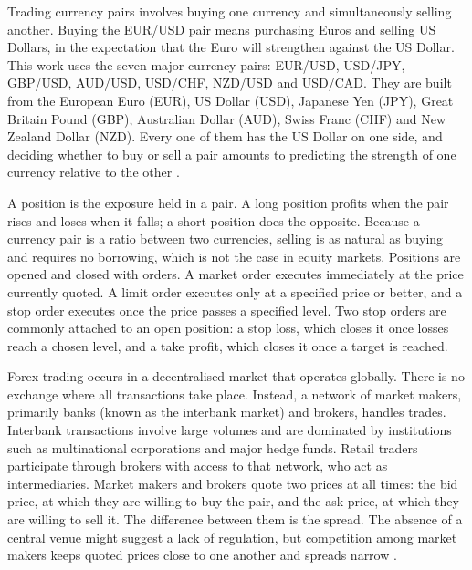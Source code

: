Trading currency pairs involves buying one currency and simultaneously selling another. Buying the EUR/USD pair means purchasing Euros and selling US Dollars, in the expectation that the Euro will strengthen against the US Dollar. This work uses the seven major currency pairs: EUR/USD, USD/JPY, GBP/USD, AUD/USD, USD/CHF, NZD/USD and USD/CAD. They are built from the European Euro (EUR), US Dollar (USD), Japanese Yen (JPY), Great Britain Pound (GBP), Australian Dollar (AUD), Swiss Franc (CHF) and New Zealand Dollar (NZD). Every one of them has the US Dollar on one side, and deciding whether to buy or sell a pair amounts to predicting the strength of one currency relative to the other \cite{donnelly_art_2019}.

A position is the exposure held in a pair. A long position profits when the pair rises and loses when it falls; a short position does the opposite. Because a currency pair is a ratio between two currencies, selling is as natural as buying and requires no borrowing, which is not the case in equity markets. Positions are opened and closed with orders. A market order executes immediately at the price currently quoted. A limit order executes only at a specified price or better, and a stop order executes once the price passes a specified level. Two stop orders are commonly attached to an open position: a stop loss, which closes it once losses reach a chosen level, and a take profit, which closes it once a target is reached.

Forex trading occurs in a decentralised market that operates globally. There is no exchange where all transactions take place. Instead, a network of market makers, primarily banks (known as the interbank market) and brokers, handles trades. Interbank transactions involve large volumes and are dominated by institutions such as multinational corporations and major hedge funds. Retail traders participate through brokers with access to that network, who act as intermediaries. Market makers and brokers quote two prices at all times: the bid price, at which they are willing to buy the pair, and the ask price, at which they are willing to sell it. The difference between them is the spread. The absence of a central venue might suggest a lack of regulation, but competition among market makers keeps quoted prices close to one another and spreads narrow \cite{donnelly_art_2019}.

